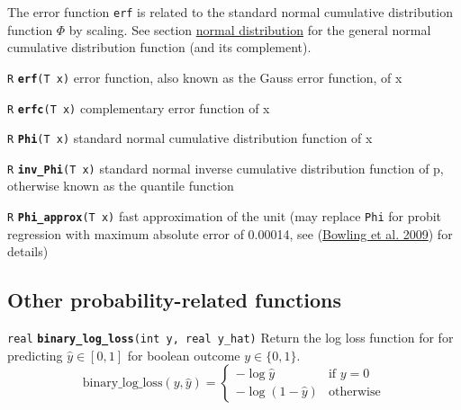 \documentclass[
  10pt,
]{book}
\begin{document}
The error function \texttt{erf} is related to the standard normal cumulative
distribution function \(\Phi\) by scaling. See section
\protect\hyperlink{normal-distribution}{normal distribution} for the general normal cumulative
distribution function (and its complement).


\texttt{R} \textbf{\texttt{erf}}\texttt{(T\ x)}\newline
error function, also known as the Gauss error function, of x


\texttt{R} \textbf{\texttt{erfc}}\texttt{(T\ x)}\newline
complementary error function of x


\texttt{R} \textbf{\texttt{Phi}}\texttt{(T\ x)}\newline
standard normal cumulative distribution function of x


\texttt{R} \textbf{\texttt{inv\_Phi}}\texttt{(T\ x)}\newline
standard normal inverse cumulative distribution function of p,
otherwise known as the quantile function


\texttt{R} \textbf{\texttt{Phi\_approx}}\texttt{(T\ x)}\newline
fast approximation of the unit (may replace \texttt{Phi} for probit
regression with maximum absolute error of 0.00014, see
(\protect\hyperlink{ref-BowlingEtAl:2009}{Bowling et al. 2009}) for details)

\hypertarget{other-probability-related-functions}{%
\subsection{Other probability-related functions}\label{other-probability-related-functions}}


\texttt{real} \textbf{\texttt{binary\_log\_loss}}\texttt{(int\ y,\ real\ y\_hat)}\newline
Return the log loss function for for predicting \(\hat{y} \in [0,1]\)
for boolean outcome \(y \in \{0,1\}\). \[
\mathrm{binary\_log\_loss}(y,\hat{y}) = \begin{cases} -\log \hat{y} &
\text{if } y = 0\\ -\log (1 - \hat{y}) & \text{otherwise} \end{cases}
\]
\end{document}
